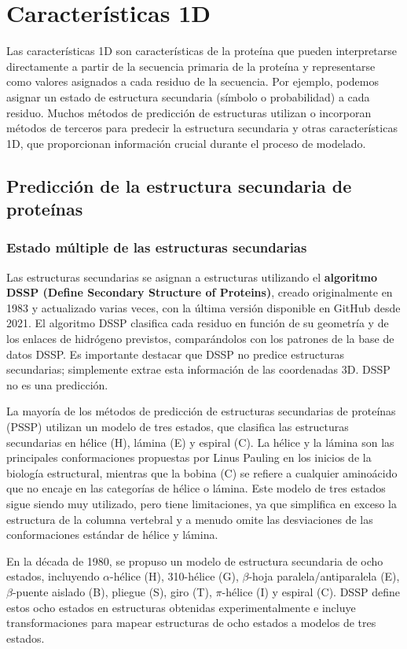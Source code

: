 \chapter{Características 1D}
Las características 1D son características de la proteína que pueden interpretarse directamente a partir de la secuencia primaria de la proteína y representarse como valores asignados a cada residuo de la secuencia. Por ejemplo, podemos asignar un estado de estructura secundaria (símbolo o probabilidad) a cada residuo. Muchos métodos de predicción de estructuras utilizan o incorporan métodos de terceros para predecir la estructura secundaria y otras características 1D, que proporcionan información crucial durante el proceso de modelado.

\section{Predicción de la estructura secundaria de proteínas}
\subsection{Estado múltiple de las estructuras secundarias}
Las estructuras secundarias se asignan a estructuras utilizando el \textbf{algoritmo DSSP (Define Secondary Structure of Proteins)}, creado originalmente en 1983 y actualizado varias veces, con la última versión disponible en GitHub desde 2021. El algoritmo DSSP clasifica cada residuo en función de su geometría y de los enlaces de hidrógeno previstos, comparándolos con los patrones de la base de datos DSSP. Es importante destacar que DSSP no predice estructuras secundarias; simplemente extrae esta información de las coordenadas 3D. DSSP no es una predicción.

La mayoría de los métodos de predicción de estructuras secundarias de proteínas (PSSP) utilizan un modelo de tres estados, que clasifica las estructuras secundarias en hélice (H), lámina (E) y espiral (C). La hélice y la lámina son las principales conformaciones propuestas por Linus Pauling en los inicios de la biología estructural, mientras que la bobina (C) se refiere a cualquier aminoácido que no encaje en las categorías de hélice o lámina. Este modelo de tres estados sigue siendo muy utilizado, pero tiene limitaciones, ya que simplifica en exceso la estructura de la columna vertebral y a menudo omite las desviaciones de las conformaciones estándar de hélice y lámina.

En la década de 1980, se propuso un modelo de estructura secundaria de ocho estados, incluyendo $\alpha$-hélice (H), 310-hélice (G), $\beta$-hoja paralela/antiparalela (E), $\beta$-puente aislado (B), pliegue (S), giro (T), $\pi$-hélice (I) y espiral (C). DSSP define estos ocho estados en estructuras obtenidas experimentalmente e incluye transformaciones para mapear estructuras de ocho estados a modelos de tres estados.

